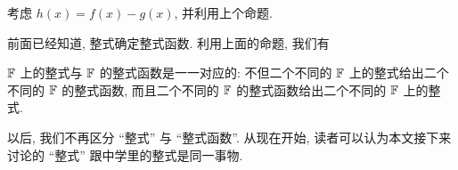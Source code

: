 \begin{pf}
    考虑 $h(x) = f(x) - g(x)$, 并利用上个命题.
\end{pf}

前面已经知道, 整式确定整式函数. 利用上面的命题, 我们有

\begin{proposition}
    $\mathbb{F}$ 上的整式与 $\mathbb{F}$ 的整式函数是一一对应的: 不但二个不同的 $\mathbb{F}$ 上的整式给出二个不同的 $\mathbb{F}$ 的整式函数, 而且二个不同的 $\mathbb{F}$ 的整式函数给出二个不同的 $\mathbb{F}$ 上的整式.
\end{proposition}

\begin{remark}
    以后, 我们不再区分 ``整式'' 与 ``整式函数''. 从现在开始, 读者可以认为本文接下来讨论的 ``整式'' 跟中学里的整式是同一事物.
\end{remark}
